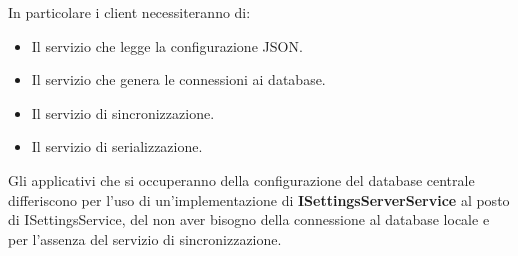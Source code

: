\documentclass[\main/tesi.tex]{subfiles}
\begin{document}
In particolare i client necessiteranno di:
\begin{itemize}
    \item Il servizio che legge la configurazione JSON.
    \item Il servizio che genera le connessioni ai database.
    \item Il servizio di sincronizzazione.
    \item Il servizio di serializzazione.
\end{itemize}
Gli applicativi che si occuperanno della configurazione del database centrale differiscono per l'uso di un'implementazione di \textbf{ISettingsServerService} al posto di ISettingsService, del non aver bisogno della connessione al database locale e per l'assenza del servizio di sincronizzazione.\\
\end{document}
